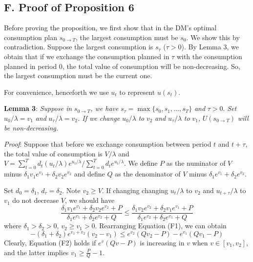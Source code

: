 \documentclass[
  12pt,
]{article}
\begin{document}
\hypertarget{f.-proof-of-proposition-6}{%
\subsection*{F. Proof of Proposition
6}\label{f.-proof-of-proposition-6}}

Before proving the proposition, we first show that in the DM's optimal
consumption plan \(s_{0\rightarrow T}\), the largest consumption must be
\(s_0\). We show this by contradiction. Suppose the largest consumption
is \(s_\tau\) (\(\tau>0\)). By Lemma 3, we obtain that if we exchange
the consumption planned in \(\tau\) with the consumption planned in
period 0, the total value of consumption will be non-decreasing. So, the
largest consumption must be the current one.

For convenience, henceforth we use \(u_t\) to represent \(u(s_t)\).

\noindent \textbf{Lemma 3}: \emph{Suppose in}
\(s_{0\rightarrow T}\)\emph{, we have}
\(s_\tau= \max\{s_0,s_1,...,s_T\}\) \emph{and} \(\tau>0\). \emph{Set}
\(u_0/\lambda=v_1\) \emph{and} \(u_{\tau}/\lambda=v_2\)\emph{. If we
change} \(u_0/\lambda\) \emph{to} \(v_2\) \emph{and}
\(u_{\tau}/\lambda\) \emph{to} \(v_1\)\emph{,} \(U(s_{0\rightarrow T})\)
\emph{will be non-decreasing.}

\noindent \emph{Proof}: Suppose that before we exchange consumption
between period \(t\) and \(t+\tau\), the total value of consumption is
\(V/\lambda\) and
\(V=\sum_{t=0}^Td_t(u_t/\lambda)e^{u_t/\lambda}/\sum_{t=0}^Td_te^{u_t/\lambda}\).
We define \(P\) as the numinator of \(V\) minus
\(\delta_1v_1e^{v_1}+\delta_2v_2e^{v_2}\) and define \(Q\) as the
denominator of \(V\) minus \(\delta_1e^{v_1}+\delta_2e^{v_2}\).

Set \(d_0=\delta_1\), \(d_\tau=\delta_2\). Note \(v_2\geq V\). If
changing changing \(u_t/\lambda\) to \(v_2\) and \(u_{t+\tau}/\lambda\)
to \(v_1\) do not decrease \(V\), we should have
\[\tag{F1} \frac{\delta_1v_1e^{v_1}+ \delta_2v_2e^{v_2}+P}{\delta_1e^{v_1}+\delta_2e^{v_2}+Q} \leq  \frac{\delta_1v_2e^{v_2}+ \delta_2v_1e^{v_1}+P}{\delta_1e^{v_2}+\delta_2e^{v_1}+Q} \]where
\(\delta_1>\delta_2>0\), \(v_2\geq v_1>0\). Rearranging Equation (F1),
we can
obtain\[\tag{F2} -(\delta_1+\delta_2)e^{v_1+v_2}(v_2-v_1)\leq e^{v_2}(Qv_2-P)-e^{v_1}(Qv_1-P) \]Clearly,
Equation (F2) holds if \(e^v(Qv-P)\) is increasing in \(v\) when
\(v\in[v_1,v_2]\), and the latter implies \(v_1\geq \frac{P}{Q}-1\).
\end{document}
